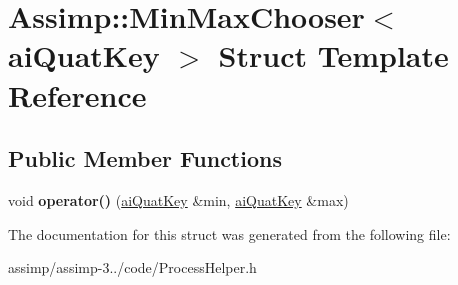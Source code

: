 \hypertarget{struct_assimp_1_1_min_max_chooser_3_01ai_quat_key_01_4}{\section{Assimp\+:\+:Min\+Max\+Chooser$<$ ai\+Quat\+Key $>$ Struct Template Reference}
\label{struct_assimp_1_1_min_max_chooser_3_01ai_quat_key_01_4}
}
\subsection*{Public Member Functions}
\begin{DoxyCompactItemize}
\item 
\hypertarget{struct_assimp_1_1_min_max_chooser_3_01ai_quat_key_01_4_a72f98c7c31d778cffb21bd82bf472d0a}{void {\bfseries operator()} (\hyperlink{structai_quat_key}{ai\+Quat\+Key} \&min, \hyperlink{structai_quat_key}{ai\+Quat\+Key} \&max)}\label{struct_assimp_1_1_min_max_chooser_3_01ai_quat_key_01_4_a72f98c7c31d778cffb21bd82bf472d0a}

\end{DoxyCompactItemize}


The documentation for this struct was generated from the following file\+:\begin{DoxyCompactItemize}
\item 
assimp/assimp-\/3../code/Process\+Helper.\+h\end{DoxyCompactItemize}
